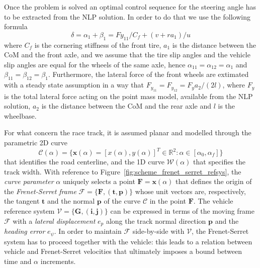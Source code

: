 \documentclass[conference]{IEEEtran} %
\renewcommand{\vec}[1]{\boldsymbol{#1}}
\begin{document}
Once the problem is solved an optimal control sequence for the steering angle has to be extracted from the NLP solution. In order to do that we use the following formula
\begin{equation}
\delta = \alpha_{1} + \beta_1 = Fy_{11}/C_f + (v + ra_1)/u
\end{equation}
where $C_f$ is the cornering stiffness of the front tire, $a_1$ is the distance between the CoM and the front axle, and we assume that the tire slip angles and the vehicle slip angles are equal for the wheels of the same axle, hence $\alpha_{11} = \alpha_{12} = \alpha_{1}$ and  $\beta_{11} = \beta_{12} = \beta_{1}$. 
Furthermore, the lateral force of the front wheels are extimated with a steady state assumption in a way that $F_{y_{11}} = F_{y_{12}} = F_{y}a_2/(2l)$, where $F_{y}$ is the total lateral force acting on the point mass model, available from the NLP solution, $a_2$ is the distance between the CoM and the rear axle and $l$ is the wheelbase.



For what concern the race track, it is assumed planar and modelled through the parametric 2D curve
\begin{equation}
\mathcal C(\alpha) = \{ \vec x (\alpha) = [x(\alpha), y(\alpha)]^T \in \mathbb{R}^2 : \alpha \in [\alpha_0, \alpha_f] \}
\end{equation}
%
that identifies the road centerline, and the 1D curve $\mathcal W(\alpha)$ that specifies the track width.
With reference to Figure~\ref{fig:scheme_frenet_serret_refsys}, the \emph{curve parameter} $\alpha$ uniquely selects a point $\vec F = \vec x(\alpha)$ that defines the origin of the \emph{Frenet-Serret frame} $\mathcal F = \{ \vec F, (\vec t, \vec p) \}$ whose unit vectors are, respectively, the tangent $\vec t$ and the normal $\vec p$ of the curve $\mathcal C$ in the point $\vec F$.
%
The vehicle reference system $\mathcal V = \{ \vec G, (\vec i, \vec j) \}$ can be expressed in terms of the moving frame $\mathcal F$ with a \emph{lateral displacement} $e_p$ along the track normal direction $\vec p$ and the \emph{heading error} $e_\psi$.
In order to maintain $\mathcal F$ side-by-side with $\mathcal V$, the Frenet-Serret system has to proceed together with the vehicle: this leads to a relation between vehicle and Frenet-Serret velocities that ultimately imposes a bound between time and $\alpha$ increments.
\end{document}
